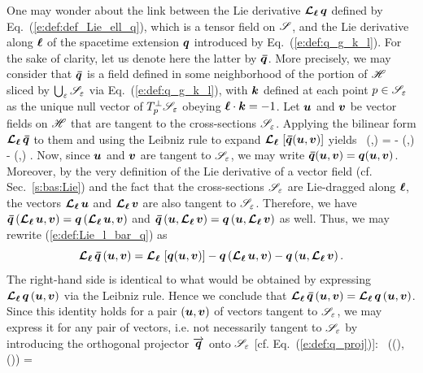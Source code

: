 One may wonder about the link between the Lie derivative $\bm{\mathcal{L}}_{\bm{\ell}}\, \bm{q}$ defined
by Eq.~(\ref{e:def:def_Lie_ell_q}), which is a tensor field on $\mathscr{S}$,
and the Lie derivative along $\bm{\ell}$ of the spacetime extension $\bm{q}$ introduced by
Eq.~(\ref{e:def:q_g_k_l}). For the sake of clarity, let us denote here the latter
by $\bm{\bar q}$. More precisely, we may consider that $\bm{\bar q}$ is a
field defined in some neighborhood of the portion of $\mathscr{H}$ sliced by
$\bigcup_{\varepsilon} \mathscr{S}_\varepsilon$ via Eq.~(\ref{e:def:q_g_k_l}), with $\bm{k}$
defined at each point $p\in\mathscr{S}_\varepsilon$ as the unique null vector of
$T_p^\perp\mathscr{S}_\varepsilon$ obeying $\bm{\ell}\cdot\bm{k}=-1$.
Let $\bm{u}$ and $\bm{v}$ be vector fields on $\mathscr{H}$ that are tangent
to the cross-sections $\mathscr{S}_\varepsilon$. Applying the bilinear form
$\bm{\mathcal{L}}_{\bm{\ell}}\,\bm{\bar q}$ to them and using the Leibniz rule to expand
$\bm{\mathcal{L}}_{\bm{\ell}}\, \left[ \bm{\bar q}(\bm{u},\bm{v}) \right]$ yields
\be \label{e:def:Lie_l_bar_q}
     \Lie{\el}  \, (,) = \Lie{\el} 
        - \left(\Lie{\el},\right)
         - \left(,\Lie{\el}\right) .
\ee
Now, since $\bm{u}$ and $\bm{v}$ are tangent to $\mathscr{S}_\varepsilon$, we may
write $\bm{\bar q}(\bm{u},\bm{v}) = \bm{q}(\bm{u},\bm{v})$. Moreover, by the very
definition of the Lie derivative of a vector field (cf. Sec.~\ref{s:bas:Lie})
and the fact that the cross-sections
$\mathscr{S}_\varepsilon$ are Lie-dragged along $\bm{\ell}$, the vectors
$\bm{\mathcal{L}}_{\bm{\ell}}\,\bm{u}$ and $\bm{\mathcal{L}}_{\bm{\ell}}\,\bm{v}$ are also tangent to $\mathscr{S}_\varepsilon$.
Therefore, we have
$\bm{\bar q}\left(\bm{\mathcal{L}}_{\bm{\ell}}\,\bm{u},\bm{v}\right) = \bm{q} \left(\bm{\mathcal{L}}_{\bm{\ell}}\,\bm{u},\bm{v}\right)$
and
$\bm{\bar q}\left(\bm{u},\bm{\mathcal{L}}_{\bm{\ell}}\,\bm{v}\right) = \bm{q}\left(\bm{u},\bm{\mathcal{L}}_{\bm{\ell}}\,\bm{v}\right)$
as well. Thus, we may rewrite (\ref{e:def:Lie_l_bar_q}) as
\[
     \bm{\mathcal{L}}_{\bm{\ell}}\, \bm{\bar q} \, (\bm{u},\bm{v}) = \bm{\mathcal{L}}_{\bm{\ell}}\, \left[ \bm{q}(\bm{u},\bm{v}) \right]
        - \bm{q}\left(\bm{\mathcal{L}}_{\bm{\ell}}\,\bm{u},\bm{v}\right)
         - \bm{q}\left(\bm{u},\bm{\mathcal{L}}_{\bm{\ell}}\,\bm{v}\right) .
\]
The right-hand side is identical to what would be obtained by expressing
$\bm{\mathcal{L}}_{\bm{\ell}}\, \bm{q} \, (\bm{u},\bm{v})$ via the Leibniz rule. Hence we conclude
that $\bm{\mathcal{L}}_{\bm{\ell}}\, \bm{\bar q} \, (\bm{u},\bm{v}) = \bm{\mathcal{L}}_{\bm{\ell}}\, \bm{q} \, (\bm{u},\bm{v})$.
Since this identity holds for a pair $(\bm{u},\bm{v})$ of vectors tangent
to $\mathscr{S}_\varepsilon$, we may express it for any pair of vectors, i.e. not
necessarily tangent to $\mathscr{S}_\varepsilon$ by introducing the orthogonal
projector $\overrightarrow{\bm{q}}$ onto $\mathscr{S}_\varepsilon$ [cf. Eq.~(\ref{e:def:q_proj})]:
\be \label{e:def:Lie_ell_bar_q}
    \Lie{\el}  \, ((),()) =

